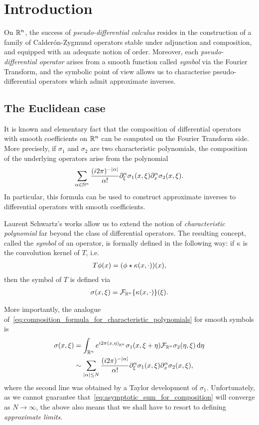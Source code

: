\chapter{Introduction}

On $\R^n$,
the success of \emph{pseudo-differential calculus} resides in the construction of a family of Calder\'on-Zygmund operators stable under adjunction and composition,
and equipped with an adequate notion of order.
Moreover,
each \emph{pseudo-differential operator} arises from a smooth function called \emph{symbol} via the Fourier Transform,
and the symbolic point of view allows us to characterise pseudo-differential operators which admit approximate inverses.


\section{The Euclidean case}

It is known and elementary fact that
the composition of differential operators with smooth coefficients on $\R^n$ can be computed on the Fourier Transform side.
More precisely,
if $\sigma_1$ and $\sigma_2$ are two characteristic polynomials,
the composition of the underlying operators arise from the polynomial
\begin{align}
    \sum_{\alpha \in \N^n} \frac {(\i \turn)^{-\abs \alpha}} {\alpha!} \iD{\xi^\alpha} \sigma_1(x, \xi) \iD{x^\alpha} \sigma_2(x, \xi)
    \label{eq:composition_formula_for_characteristic_polynomials}.
\end{align}
In particular,
this formula can be used to construct approximate inverses to differential operators with smooth coefficients.

Laurent Schwartz's works allow us to extend the notion of \emph{characteristic polynomial} far beyond the class of differential operators.
The resulting concept,
called the \emph{symbol} of an operator,
is formally defined in the following way:
if $\kappa$ is the convolution kernel of $T$, i.e.\
\begin{align*}
    T \phi(x) = (\conv \phi {\kappa(x, \dummy)})(x),
\end{align*}
then the symbol of $T$ is defined via
\begin{align*}
    \sigma(x, \xi) = \Fourier [\R^n] \{\kappa(x, \dummy)\}(\xi).
\end{align*}

More importantly,
the analogue of~\eqref{eq:composition_formula_for_characteristic_polynomials} for smooth symbols is
\begin{align}
    \sigma(x, \xi)
    &= \int_{\R^n} \e^{\i \turn \ip [\R^n] x \eta} \sigma_1(x, \xi + \eta) \Fourier [\R^n] \sigma_2(\eta, \xi) \dd \eta \notag\\
    &\sim \sum_{\abs \alpha \leq N} \frac {(\i \turn)^{-\abs \alpha}} {\alpha!} \iD{\xi^\alpha} \sigma_1(x, \xi) \iD{x^\alpha} \sigma_2(x, \xi),
    \label{eq:asymptotic_sum_for_composition}
\end{align}
where the second line was obtained by a Taylor development of $\sigma_1$.
Unfortunately,
as we cannot guarantee that~\eqref{eq:asymptotic_sum_for_composition} will converge as $N \to \infty$,
the above also means that we shall have to resort to defining \emph{approximate limits}.

